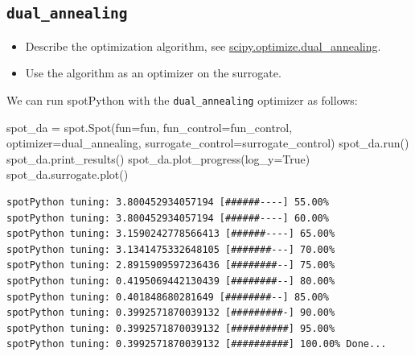 \documentclass[
  letterpaper,
  DIV=11,
  numbers=noendperiod]{scrreprt}
\newenvironment{Shaded}{\begin{snugshade}}{\end{snugshade}}
\newcommand{\NormalTok}[1]{\textcolor[rgb]{0.00,0.23,0.31}{#1}}
\newcommand{\OperatorTok}[1]{\textcolor[rgb]{0.37,0.37,0.37}{#1}}
\newcommand{\VariableTok}[1]{\textcolor[rgb]{0.07,0.07,0.07}{#1}}
\providecommand{\tightlist}{%
  \setlength{\itemsep}{0pt}\setlength{\parskip}{0pt}}\usepackage{longtable,booktabs,array}
\begin{document}
\subsection{\texorpdfstring{\texttt{dual\_annealing}}{dual\_annealing}}\label{dual_annealing}

\begin{itemize}
\tightlist
\item
  Describe the optimization algorithm, see
  \href{https://docs.scipy.org/doc/scipy/reference/generated/scipy.optimize.dual_annealing.html}{scipy.optimize.dual\_annealing}.
\item
  Use the algorithm as an optimizer on the surrogate.
\end{itemize}

\begin{tcolorbox}[enhanced jigsaw, rightrule=.15mm, coltitle=black, title=\textcolor{quarto-callout-tip-color}{\faLightbulb}\hspace{0.5em}{Tip: Selecting the Optimizer for the Surrogate}, opacitybacktitle=0.6, bottomrule=.15mm, opacityback=0, left=2mm, colback=white, leftrule=.75mm, colframe=quarto-callout-tip-color-frame, colbacktitle=quarto-callout-tip-color!10!white, toprule=.15mm, toptitle=1mm, bottomtitle=1mm, titlerule=0mm, breakable, arc=.35mm]

We can run spotPython with the \texttt{dual\_annealing} optimizer as
follows:

\begin{Shaded}
\begin{Highlighting}[]
\NormalTok{spot\_da }\OperatorTok{=}\NormalTok{ spot.Spot(fun}\OperatorTok{=}\NormalTok{fun,}
\NormalTok{                    fun\_control}\OperatorTok{=}\NormalTok{fun\_control,}
\NormalTok{                    optimizer}\OperatorTok{=}\NormalTok{dual\_annealing,}
\NormalTok{                    surrogate\_control}\OperatorTok{=}\NormalTok{surrogate\_control)}
\NormalTok{spot\_da.run()}
\NormalTok{spot\_da.print\_results()}
\NormalTok{spot\_da.plot\_progress(log\_y}\OperatorTok{=}\VariableTok{True}\NormalTok{)}
\NormalTok{spot\_da.surrogate.plot()}
\end{Highlighting}
\end{Shaded}

\begin{verbatim}
spotPython tuning: 3.800452934057194 [######----] 55.00% 
spotPython tuning: 3.800452934057194 [######----] 60.00% 
spotPython tuning: 3.1590242778566413 [######----] 65.00% 
spotPython tuning: 3.1341475332648105 [#######---] 70.00% 
spotPython tuning: 2.8915909597236436 [########--] 75.00% 
spotPython tuning: 0.4195069442130439 [########--] 80.00% 
spotPython tuning: 0.401848680281649 [########--] 85.00% 
spotPython tuning: 0.3992571870039132 [#########-] 90.00% 
spotPython tuning: 0.3992571870039132 [##########] 95.00% 
spotPython tuning: 0.3992571870039132 [##########] 100.00% Done...


\end{verbatim}
\end{tcolorbox}
\end{document}
